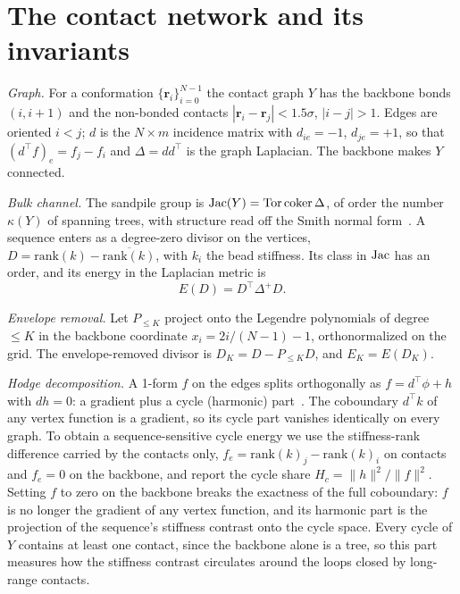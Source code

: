 \documentclass[reprint,amsmath,amssymb,aps,pre,longbibliography]{revtex4-2}
\begin{document}
\section{The contact network and its invariants}\label{sec:defs}

\emph{Graph.} For a conformation $\{\mathbf r_i\}_{i=0}^{N-1}$ the contact graph $Y$ has the
backbone bonds $(i,i+1)$ and the non-bonded contacts $|\mathbf r_i-\mathbf r_j|<1.5\sigma$,
$|i-j|>1$. Edges are oriented $i<j$; $d$ is the $N\times m$ incidence matrix with $d_{ie}=-1$,
$d_{je}=+1$, so that $(d^{\top}f)_e=f_j-f_i$ and $\Delta=dd^{\top}$ is the graph Laplacian. The
backbone makes $Y$ connected.

\emph{Bulk channel.} The sandpile group is ${\rm Jac}(Y)={\rm Tor}\,{\rm coker}\,\Delta$, of order
the number $\kappa(Y)$ of spanning trees, with structure read off the Smith normal
form~\cite{Biggs,ANCCFT}. A sequence enters as a degree-zero divisor on the vertices,
$D=\mathrm{rank}(k)-\overline{\mathrm{rank}(k)}$, with $k_i$ the bead stiffness. Its class in
${\rm Jac}$ has an order, and its energy in the Laplacian metric is
\begin{equation}
E(D)=D^{\top}\Delta^{+}D .
\label{eq:E}
\end{equation}

\emph{Envelope removal.} Let $P_{\le K}$ project onto the Legendre polynomials of degree $\le K$
in the backbone coordinate $x_i=2i/(N-1)-1$, orthonormalized on the grid. The envelope-removed
divisor is $D_K=D-P_{\le K}D$, and $E_K=E(D_K)$.

\emph{Hodge decomposition.} A 1-form $f$ on the edges splits orthogonally as
$f=d^{\top}\phi+h$ with $dh=0$: a gradient plus a cycle (harmonic) part~\cite{Lim,ANCCFT}. The
coboundary $d^{\top}k$ of any vertex function is a gradient, so its cycle part vanishes
identically on every graph. To obtain a sequence-sensitive cycle energy we use the stiffness-rank
difference carried by the contacts only, $f_e=\mathrm{rank}(k)_j-\mathrm{rank}(k)_i$ on contacts
and $f_e=0$ on the backbone, and report the cycle share $H_c=\|h\|^2/\|f\|^2$. Setting $f$ to zero on the backbone breaks the
exactness of the full coboundary: $f$ is no longer the gradient of any vertex function, and its
harmonic part is the projection of the sequence's stiffness contrast onto the cycle space. Every
cycle of $Y$ contains at least one contact, since the backbone alone is a tree, so this part
measures how the stiffness contrast circulates around the loops closed by long-range contacts.
\end{document}
